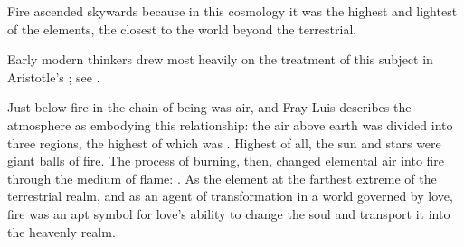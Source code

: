 
Fire ascended skywards because in this cosmology it was the highest and
lightest of the elements, the closest to the world beyond the terrestrial.%
\begin{Footnote}
    Early modern thinkers drew most heavily on the treatment of this subject in
    Aristotle's ; see \autocite{Lang:AristotleMedieval}.
\end{Footnote}
Just below fire in the chain of being was air, and Fray Luis describes the
atmosphere as embodying this relationship: the air above earth was divided into
three regions, the highest of which was .%
    \Autocite[207]{LuisdeGranada:Simbolo}
Highest of all, the sun and stars were giant balls of fire.
The process of burning, then, changed elemental air into fire through the
medium of flame: .%
    \Autocite[205]{LuisdeGranada:Simbolo}
As the element at the farthest extreme of the terrestrial realm, and as an
agent of transformation in a world governed by love, fire was an apt symbol for
love's ability to change the soul and transport it into the heavenly realm.


